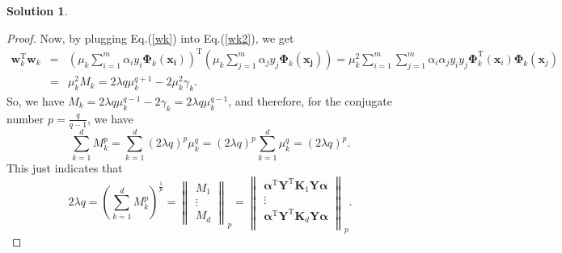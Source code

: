 \documentclass[a4paper,UTF8]{article}
\numberwithin{equation}{section}
\theoremstyle{definition}
\newtheorem*{solution}{Solution}
\begin{document}
\begin{solution}
\begin{proof}
Now, by plugging Eq.(\ref{wk}) into Eq.(\ref{wk2}), we get
\begin{eqnarray}
\bm{w}_k^\mathrm{T}\bm{w}_k&=&\left(\mu_k\sum_{i=1}^m\alpha_i y_i\bm{\Phi}_k(\bm{x_i})\right)^\mathrm{T}\left(\mu_k\sum_{j=1}^m\alpha_j y_j\bm{\Phi}_k(\bm{x_j})\right)=\mu_k^2\sum_{i=1}^m\sum_{j=1}^m\alpha_i\alpha_jy_iy_j\bm{\Phi}_k^\mathrm{T}(\bm{x}_i)\bm{\Phi}_k(\bm{x}_j)\nonumber\\
&=&\mu_k^2M_k=2\lambda q\mu_k^{q+1}-2\mu_k^2\gamma_k.\label{mk2lambda}
\end{eqnarray}
So, we have $M_k=2\lambda q\mu_k^{q-1}-2\gamma_k=2\lambda q\mu_k^{q-1}$, and therefore, for the conjugate number $p=\frac{q}{q-1}$, we have
\begin{equation}
\sum_{k=1}^dM_k^p=\sum_{k=1}^d(2\lambda q)^p\mu_k^q=(2\lambda q)^p\sum_{k=1}^d\mu_k^q=(2\lambda q)^p.
\end{equation}
This just indicates that
\begin{equation}
2\lambda q=\left(\sum_{k=1}^dM_k^p\right)^{\frac{1}{p}}
=\left\lVert
\begin{matrix}
  M_1 \\
   \vdots \\
  M_d
  \end{matrix}\right\rVert_p
=\left\lVert
\begin{matrix}
   \bm\alpha^\mathrm{T}\bm{Y}^\mathrm{T} \bm{K}_1 \bm{Y}\bm\alpha \\
   \vdots \\
   \bm\alpha^\mathrm{T}\bm{Y}^\mathrm{T} \bm{K}_d \bm{Y}\bm\alpha \\
  \end{matrix}\right\rVert_p.\label{mvp}
\end{equation}



\end{proof}
\end{solution}
\end{document}
